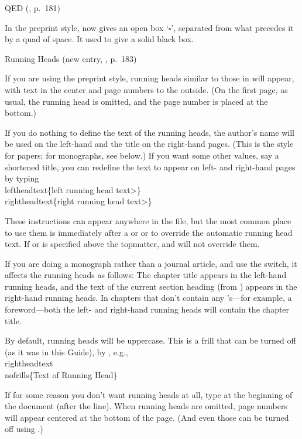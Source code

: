 \subhead QED {\rm (\Joy, p.~181)}
\endsubhead

In the preprint style,  now gives an open box `$\square$',
separated from what precedes it by a quad of space.  It used to
give a solid black box.


\subhead Running Heads {\rm (new entry, \Joy, p.~183)}
\endsubhead

If you are using the preprint style, running heads similar to those in
\Joy{} will appear, with text in the center and page numbers to the
outside.  (On the first page, as usual, the running head is omitted, and
the page number is placed at the bottom.)

If you do nothing to define the text of the running heads, the author's
name will be used on the left-hand and the title on the right-hand pages.
(This is the style for papers; for monographs, see below.)
If you want some other values, say a shortened title, you
can redefine the text to appear on left- and right-hand pages by typing
\beginexample{}
\\leftheadtext\{\<left running head text>\}
\\rightheadtext\{\<right running head text>\}
\endexample

\noindent These instructions can appear anywhere in the file, but the most
common place to use them is immediately after a  or
 or  to override the automatic running head text. 
If  or  is specified above the
topmatter,  and  will not override them.

If you are doing a monograph rather than a journal article, and use
the  switch, it affects the running heads as follows:
The chapter title appears in the left-hand running heads, and the text of
the current section heading (from ) appears in the right-hand
running heads.  In chapters that don't contain any 's---for
example, a foreword---both the left- and right-hand running heads
will contain the chapter title.

By default, running heads will be uppercase.  This is a frill that
can be turned off (as it was in this Guide), by , e.g.,
\beginexample{}
\\rightheadtext\\nofrills\{Text of Running Head\}
\endexample

If for some reason you don't want running heads at all, type
 at the beginning of the document (after the
 line).  When running heads are omitted, page numbers
will appear centered at the bottom of the page.  (And even those can be
turned off using .)

